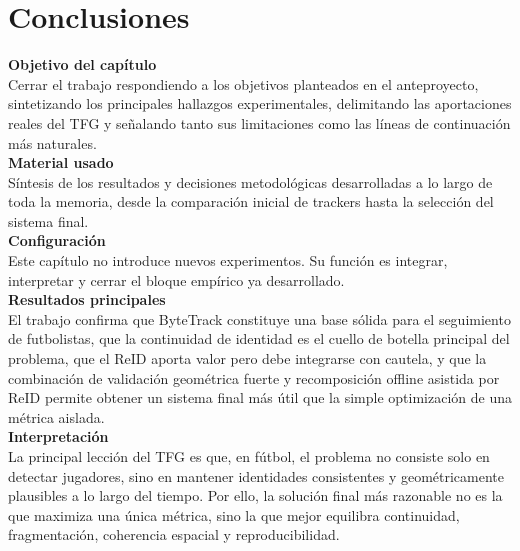 \documentclass[../MAIN.tex]{subfiles}
\begin{document}
	
	
	\section{Conclusiones}
	
	
	\begin{chaptertemplatebox}
		\textbf{Objetivo del capítulo}\\
		Cerrar el trabajo respondiendo a los objetivos planteados en el anteproyecto, sintetizando los principales hallazgos experimentales, delimitando las aportaciones reales del TFG y señalando tanto sus limitaciones como las líneas de continuación más naturales.\\[0.5em]
		
		\textbf{Material usado}\\
		Síntesis de los resultados y decisiones metodológicas desarrolladas a lo largo de toda la memoria, desde la comparación inicial de trackers hasta la selección del sistema final.\\[0.5em]
		
		\textbf{Configuración}\\
		Este capítulo no introduce nuevos experimentos. Su función es integrar, interpretar y cerrar el bloque empírico ya desarrollado.\\[0.5em]
		
		\textbf{Resultados principales}\\
		El trabajo confirma que ByteTrack constituye una base sólida para el seguimiento de futbolistas, que la continuidad de identidad es el cuello de botella principal del problema, que el ReID aporta valor pero debe integrarse con cautela, y que la combinación de validación geométrica fuerte y recomposición offline asistida por ReID permite obtener un sistema final más útil que la simple optimización de una métrica aislada.\\[0.5em]
		
		\textbf{Interpretación}\\
		La principal lección del TFG es que, en fútbol, el problema no consiste solo en detectar jugadores, sino en mantener identidades consistentes y geométricamente plausibles a lo largo del tiempo. Por ello, la solución final más razonable no es la que maximiza una única métrica, sino la que mejor equilibra continuidad, fragmentación, coherencia espacial y reproducibilidad.\\[0.5em]
		

\end{chaptertemplatebox}
\end{document}
